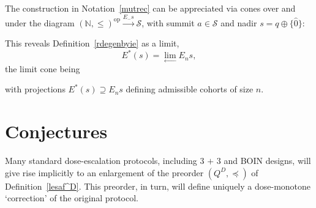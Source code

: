 \documentclass{article}
\newcommand{\N}{\mathbb{N}}
\DeclareMathOperator{\dual}{op}
\begin{document}
The construction in Notation~\ref{mutrec} can be appreciated via cones over and under the diagram $(\N,\le)^{\dual} \xrightarrow{E_{-} s} \mathcal{S}$, with summit $a \in \mathcal{S}$ and nadir $s = q\oplus\{\widehat{0}\}$:
\begin{center}
\end{center}
This reveals Definition~\ref{rdegenbyie} as a limit,
$$
E^*(s) = \lim_{\longleftarrow} E_ns,
$$
the limit cone being
\begin{center}
\end{center}
with projections $E^*(s) \supseteq E_ns$ defining admissible cohorts of size $n$.

\section{Conjectures}

\begin{conj}\label{embed}
  Many standard dose-escalation protocols, including $\mbox{3 + 3}$ and BOIN designs, will give rise implicitly to an enlargement of the preorder $(Q^D,\preceq)$ of Definition~\ref{lesaf^D}.  This preorder, in turn, will define uniquely a dose-monotone `correction' of the original protocol.
\end{conj}
\end{document}
